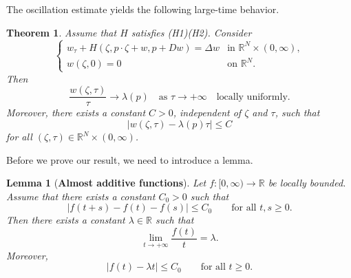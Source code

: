 \documentclass[preprint]{elsarticle}
\newtheorem{result}{\textbf{Theorem}}
\newtheorem{lemma}{Lemma}[section]
\numberwithin{equation}{section}
\begin{document}
The oscillation estimate yields the following large-time behavior.

\begin{result}\label{large time}
Assume that $H$ satisfies (H1)(H2). Consider
\begin{equation*}
\begin{cases}
w_\tau+H(\zeta,p\cdot\zeta+w,p+Dw)=\Delta w
&\text{in }\mathbb R^N \times(0,\infty),\\
w(\zeta,0)=0
&\text{on }\mathbb R^N.
\end{cases}
\end{equation*}
Then
\begin{equation*}
\frac{w(\zeta,\tau)}{\tau}\to \lambda(p)
\quad\text{as }\tau\to+\infty \quad \text{locally uniformly}.
\end{equation*}
Moreover, there exists a constant $C>0$, independent of $\zeta$ and $\tau$, such that
\[
|w(\zeta,\tau)-\lambda(p)\tau|\le C
\]
for all $(\zeta,\tau)\in\mathbb R^N\times(0,\infty)$.
\end{result}

Before we prove our result, we need to introduce a lemma.

\begin{lemma}[\textbf{Almost additive functions}]
Let $f:[0,\infty)\to\mathbb R$ be locally bounded. Assume that there exists a constant $C_0>0$ such that
\begin{equation*}
|f(t+s)-f(t)-f(s)|\le C_0
\qquad\text{for all }t,s\ge0.
\end{equation*}
Then there exists a constant $\lambda\in\mathbb R$ such that
\begin{equation*}
\lim_{t\to+\infty}\frac{f(t)}{t}=\lambda.
\end{equation*}
Moreover,
\begin{equation*}
|f(t)-\lambda t|\le C_0
\qquad\text{for all }t\ge0.
\end{equation*} \label{almost additive}
\end{lemma}
\end{document}
